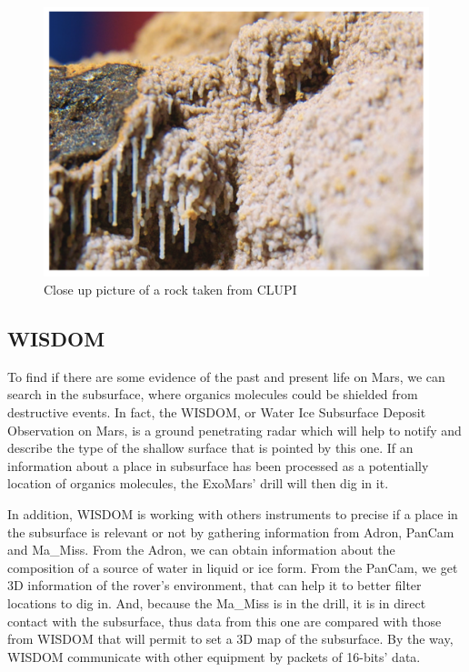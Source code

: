\documentclass[12pt,a4paper]{article}
\begin{document}
\begin{figure}[hb]
	\centering
    \includegraphics[scale = 0.5]{pictures/close_up_image.png}
    \caption{Close up picture of a rock taken from CLUPI}
\end{figure}

\pagebreak

\subsection{WISDOM}

To find if there are some evidence of the past and present life on Mars, we can search in the subsurface, where organics molecules could be shielded from destructive events. In fact, the WISDOM, or Water Ice Subsurface Deposit Observation on Mars, is a ground penetrating radar which will help to notify and describe the type of the shallow surface that is pointed by this one. If an information about a place in subsurface has been processed as a potentially location of organics molecules, the ExoMars' drill will then dig in it.\smallbreak

In addition, WISDOM is working with others instruments to precise if a place in the subsurface is relevant or not by gathering information from Adron, PanCam and Ma\_Miss. From the Adron, we can obtain information about the composition of a source of water in liquid or ice form. From the PanCam, we get 3D information of the rover's environment, that can help it to better filter locations to dig in. And, because the Ma\_Miss is in the drill, it is in direct contact with the subsurface, thus data from this one are compared with those from WISDOM that will permit to set a 3D map of the subsurface. By the way, WISDOM communicate with other equipment by packets of 16-bits' data.
\end{document}
